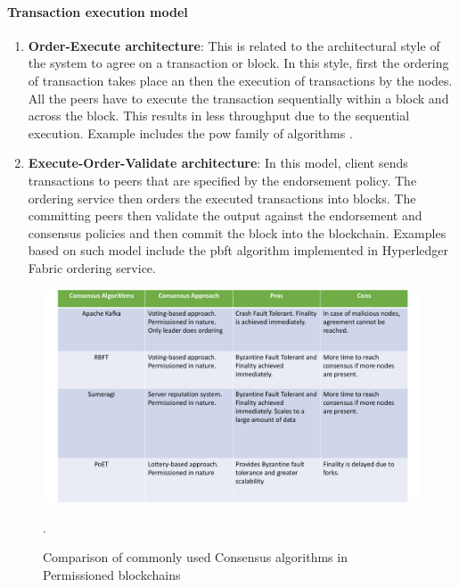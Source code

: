 \documentclass[
  a4paper,  %
  twoside,  %
  bibliography=totoc,
  headsepline,
  cleardoublepage=empty,
  parskip=half,
  draft=false
]{scrbook}
\begin{document}
\paragraph{Transaction execution model}
\begin{enumerate}
    \item \textbf{Order-Execute architecture}: This is related to the architectural style of the system to agree on a transaction or block. In this style, first the ordering of transaction takes place an then the execution of transactions by the nodes. All the peers have to execute the transaction sequentially within a block and across the block. This results in less throughput due to the sequential execution. Example includes the \gls{pow} family of algorithms \cite{HF}.
    \item \textbf{Execute-Order-Validate architecture}: In this model, client sends transactions to peers that are specified by the endorsement policy. The ordering service then orders the executed transactions into blocks. The committing peers then validate the output against the endorsement and consensus policies and then commit the block into the blockchain. Examples based on such model include the \gls{pbft} algorithm implemented in Hyperledger Fabric ordering service.
\end{enumerate}

\begin{figure}[t!]
\begin{center}
\includegraphics[width=\textwidth]{graphics/consensus.pdf}
\caption{Comparison of commonly used Consensus algorithms in Permissioned blockchains \cite{HW1}}.
\label{fig:consen}
\end{center}
\end{figure}
\end{document}
